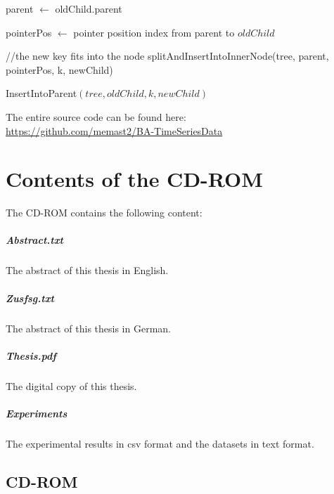 \documentclass[abstracton,12pt,oneside]{scrreprt}
\begin{document}
\begin{algorithm}[H]
	\IncMargin{1em}
	\SetAlgoLined
	\DontPrintSemicolon
	
	
	
	parent $\leftarrow$ oldChild.parent\;
	
	
	pointerPos $\leftarrow$ pointer position index from parent to $oldChild$\;
	
	//the new key fits into the node\;
	{
		splitAndInsertIntoInnerNode(tree, parent, pointerPos, k, newChild)\;
	}
	
	
	\caption{InsertIntoParent$(tree, oldChild, k, newChild)$}	\label{InsertIntoParent}
\end{algorithm}


\BlankLine
The entire source code can be found here: \\
\url{https://github.com/memast2/BA-TimeSeriesData}

\chapter{Contents of the CD-ROM}
The CD-ROM contains the following content: 
\paragraph{Abstract.txt} The abstract of this thesis in English. 
\paragraph{Zusfsg.txt} The abstract of this thesis in German. 
\paragraph{Thesis.pdf} The digital copy of this thesis. 
\paragraph{Experiments} The experimental results in csv format and the datasets in text format.  
\newpage

\section{CD-ROM}
\end{document}
